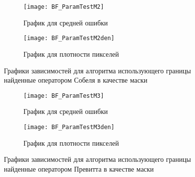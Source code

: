 \begin{figure}[h]
	\centering
	\begin{subfigure}{0.45\textwidth}  
		\centering
		\texttt{[image: BF\_ParamTestM2]}
		\caption*{График для средней ошибки}
	\end{subfigure}    
	\begin{subfigure}{0.45\textwidth}  
		\centering
		\texttt{[image: BF\_ParamTestM2den]}        
		\caption*{График для плотности пикселей}
	\end{subfigure}
	\caption{Графики зависимостей для алгоритма использующего границы найденные оператором Собеля в качестве маски}
	\label{fig:PT_BF_M2}
\end{figure}

\begin{figure}[h]
	\centering
	\begin{subfigure}{0.45\textwidth}  
		\centering
		\texttt{[image: BF\_ParamTestM3]}
		\caption*{График для средней ошибки}
	\end{subfigure}    
	\begin{subfigure}{0.45\textwidth}  
		\centering
		\texttt{[image: BF\_ParamTestM3den]}        
		\caption*{График для плотности пикселей}
	\end{subfigure}
	\caption{Графики зависимостей для алгоритма использующего границы найденные оператором Превитта в качестве маски}
	\label{fig:PT_BF_M3}
\end{figure}


